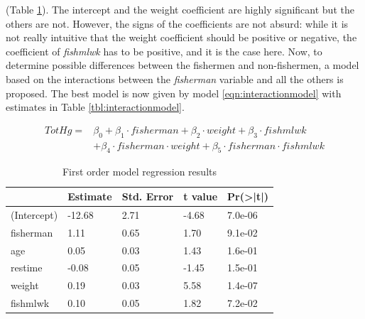 \documentclass[12pt,]{article}
\begin{document}
(Table \ref{tbl:fullmodel}). The intercept and the weight coefficient
are highly significant but the others are not. However, the signs of the
coefficients are not absurd: while it is not really intuitive that the
weight coefficient should be positive or negative, the coefficient of
\emph{fishmlwk} has to be positive, and it is the case here. Now, to
determine possible differences between the fishermen and non-fishermen,
a model based on the interactions between the \emph{fisherman} variable
and all the others is proposed. The best model is now given by model
\ref{eqn:interactionmodel} with estimates in Table
\ref{tbl:interactionmodel}.

\begin{equation}
\label{eqn:interactionmodel}
\begin{split}
TotHg = &\beta_0 + \beta_1 \cdot fisherman + \beta_2 \cdot weight +  \beta_3 \cdot fishmlwk \\&+ \beta_4 \cdot fisherman \cdot weight + \beta_5 \cdot fisherman \cdot fishmlwk
\end{split}
\end{equation}

\begin{table}[t]

\caption{\label{tab:unnamed-chunk-12}\label{tbl:fullmodel}First order model regression results}
\centering
\begin{tabular}{l|l|l|l|l}
\hline
  & Estimate & Std. Error & t value & Pr(>|t|)\\
\hline
\rowcolor{gray!6}  (Intercept) & -12.68 & 2.71 & -4.68 & 7.0e-06\\
\hline
fisherman & 1.11 & 0.65 & 1.70 & 9.1e-02\\
\hline
\rowcolor{gray!6}  age & 0.05 & 0.03 & 1.43 & 1.6e-01\\
\hline
restime & -0.08 & 0.05 & -1.45 & 1.5e-01\\
\hline
\rowcolor{gray!6}  weight & 0.19 & 0.03 & 5.58 & 1.4e-07\\
\hline
fishmlwk & 0.10 & 0.05 & 1.82 & 7.2e-02\\
\hline
\end{tabular}
\end{table}
\end{document}
